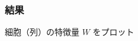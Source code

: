 \documentclass[dvipdfmx, dvipsnames]{beamer}
\begin{document}
\begin{frame}
\frametitle{結果}
細胞（列）の特徴量 $W$ をプロット


\end{frame}
\end{document}
